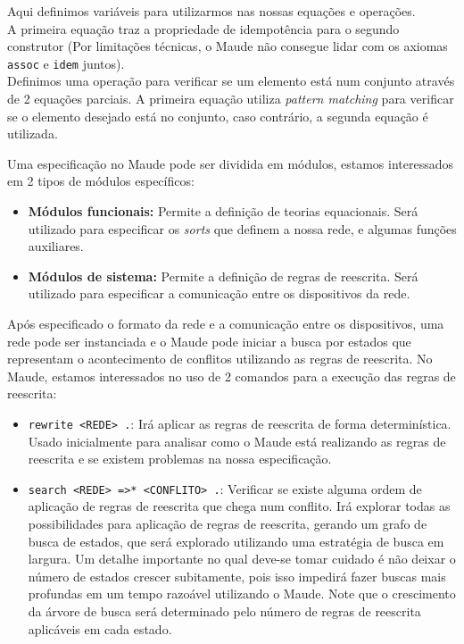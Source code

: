 \noindent
Aqui definimos variáveis para utilizarmos nas nossas equações e operações. \\
A primeira equação traz a propriedade de idempotência para o segundo construtor (Por limitações técnicas, o Maude não consegue lidar com os axiomas \texttt{assoc} e \texttt{idem} juntos). \\
Definimos uma operação para verificar se um elemento está num conjunto através de 2 equações parciais. A primeira equação utiliza \textit{pattern matching} para verificar se o elemento desejado está no conjunto, caso contrário, a segunda equação é utilizada.

Uma especificação no Maude pode ser dividida em módulos, estamos interessados em 2 tipos de módulos específicos:
\begin{itemize}
  \item \textbf{Módulos funcionais:} Permite a definição de teorias equacionais. Será utilizado para especificar os \textit{sorts} que definem a nossa rede, e algumas funções auxiliares.
  \item \textbf{Módulos de sistema:} Permite a definição de regras de reescrita. Será utilizado para especificar a comunicação entre os dispositivos da rede.
\end{itemize}

\noindent
Após especificado o formato da rede e a comunicação entre os dispositivos, uma rede pode ser instanciada e o Maude pode iniciar a busca por estados que representam o acontecimento de conflitos utilizando as regras de reescrita. No Maude, estamos interessados no uso de 2 comandos para a execução das regras de reescrita:
\begin{itemize}
  \item \texttt{rewrite <REDE> .}: Irá aplicar as regras de reescrita de forma determinística. Usado inicialmente para analisar como o Maude está realizando as regras de reescrita e se existem problemas na nossa especificação.
  \item \texttt{search <REDE> =>* <CONFLITO> .}: Verificar se existe alguma ordem de aplicação de regras de reescrita que chega num conflito. Irá explorar todas as possibilidades para aplicação de regras de reescrita, gerando um grafo de busca de estados, que será explorado utilizando uma estratégia de busca em largura. Um detalhe importante no qual deve-se tomar cuidado é não deixar o número de estados crescer subitamente, pois isso impedirá fazer buscas mais profundas em um tempo razoável utilizando o Maude. Note que o crescimento da árvore de busca será determinado pelo número de regras de reescrita aplicáveis em cada estado.
\end{itemize}